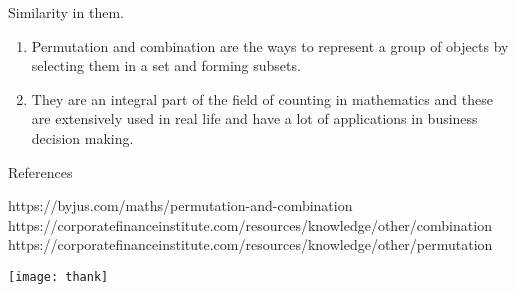 \documentclass{beamer}
\begin{document}
	\begin{frame}{Similarity in them.}
		\begin{enumerate}
			\item Permutation and combination are the ways to represent a group of objects by selecting them in a set and forming subsets.\pause \\ 
			\item They are an integral part of the field of counting in mathematics and these are extensively used in real life and have a lot of applications in business decision making.
		\end{enumerate}
	\end{frame}

\begin{frame}{References}
	\begin{thebibliography}{}
		 https://byjus.com/maths/permutation-and-combination
		 https://corporatefinanceinstitute.com/resources/knowledge/other/combination
		 https://corporatefinanceinstitute.com/resources/knowledge/other/permutation
	\end{thebibliography}
\end{frame}
	
	\begin{frame}
		\begin{center}
			\texttt{[image: thank]}
		\end{center}
	\end{frame}
	
\end{document}
